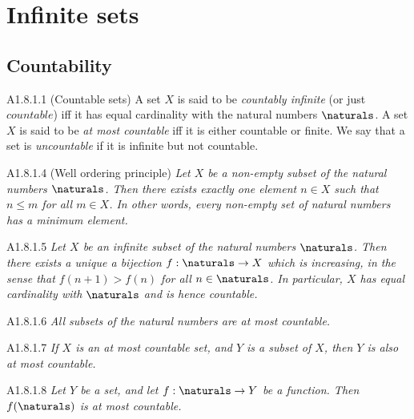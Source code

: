 \section{Infinite sets}
\subsection{Countability}
\begin{definition}{A1.8.1.1}
    (Countable sets) A set $X$ is said to be \emph{countably infinite} (or just $countable$)
    iff it has equal cardinality with the natural numbers $\naturals$. A set $X$
    is said to be \emph{at most countable} iff it is either countable or finite.
    We say that a set is \emph{uncountable} if it is infinite but not countable.
\end{definition}

\begin{proposition}{A1.8.1.4}
    (Well ordering principle) \emph{Let $X$ be a non-empty subset of the natural
    numbers $\naturals$. Then there exists exactly one element $n \in X$ such that
    $n \leq m$ for all $m \in X$. In other words, every non-empty set of natural
    numbers has a minimum element.}
\end{proposition}

\begin{proposition}{A1.8.1.5}
    \emph{Let $X$ be an infinite subset of the natural numbers $\naturals$. Then
    there exists a unique a bijection $f: \naturals \to X$ which is increasing,
    in the sense that $f(n + 1) > f(n)$ for all $n \in \naturals$. In particular,
    $X$ has equal cardinality with $\naturals$ and is hence countable.}
\end{proposition}

\begin{corollary}{A1.8.1.6}
    \emph{All subsets of the natural numbers are at most countable.}
\end{corollary}

\begin{corollary}{A1.8.1.7}
    \emph{If $X$ is an at most countable set, and $Y$ is a subset of $X$, then
    $Y$ is also at most countable.}
\end{corollary}

\begin{proposition}{A1.8.1.8}
    \emph{Let $Y$ be a set, and let $f: \naturals \to Y$ be a function. Then
    $f(\naturals)$ is at most countable.}
\end{proposition}


